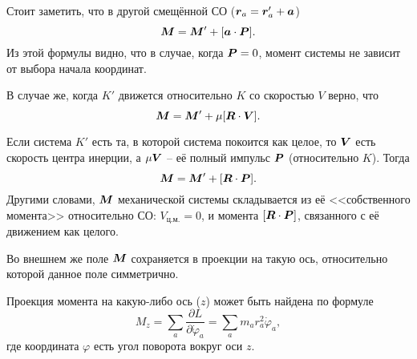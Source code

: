 \phantom{42} 

Стоит заметить, что в другой смещённой СО ($\mbox{\boldmath $r$}_a = \mbox{\boldmath $r$}_a' + \mbox{\boldmath $a$}$)
\begin{equation}
    \mbox{\boldmath $M$} = \mbox{\boldmath $M$}' + [\mbox{\boldmath $a$} \cdot \mbox{\boldmath $P$}].
\end{equation}
Из этой формулы видно, что в случае, когда $\mbox{\boldmath $P$} = 0$, момент системы не зависит от выбора начала координат. 

В случае же, когда $K'$ движется относительно $K$ со скоростью $V$ верно, что
\begin{equation}
    \mbox{\boldmath $M$} = \mbox{\boldmath $M$}' + \mu [\mbox{\boldmath $R$} \cdot \mbox{\boldmath $V$}].
\end{equation}

Если система $K'$ есть та, в которой система покоится как целое, то $\mbox{\boldmath $V$}$ есть скорость центра инерции, а $\mu \mbox{\boldmath $V$}$ -- её полный импульс $\mbox{\boldmath $P$}$ (относительно $K$). Тогда
\begin{equation}
    \mbox{\boldmath $M$} = \mbox{\boldmath $M$}' + [\mbox{\boldmath $R$} \cdot \mbox{\boldmath $P$}].
\end{equation}
Другими словами, $\mbox{\boldmath $M$}$ механической системы складывается из её <<собственного момента>> относительно СО: $V_{\text{ц.м.}}=0$, и момента $[\mbox{\boldmath $R$} \cdot \mbox{\boldmath $P$}]$, связанного с её движением как целого.

Во внешнем же поле $\mbox{\boldmath $M$}$ сохраняется в проекции на такую ось, относительно которой данное поле симметрично. 


Проекция момента на какую-либо ось ($z$) может быть найдена по формуле
\begin{equation}
    M_z = \sum\limits_a \frac{\partial L}{\partial \dot{\varphi}_a} = \sum\limits_a m_a r_a^2 \dot{\varphi}_a,
\end{equation}
где координата $\varphi$ есть угол поворота вокруг оси $z$. 